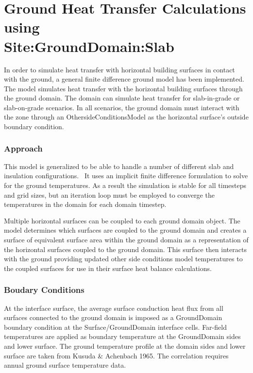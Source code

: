 \section{Ground Heat Transfer Calculations using \\ Site:GroundDomain:Slab}\label{ground-heat-transfer-calculations-using-sitegrounddomainslab}

In order to simulate heat transfer with horizontal building surfaces in contact with the ground, a general finite difference ground model has been implemented. The model simulates heat transfer with the horizontal building surfaces through the ground domain. The domain can simulate heat transfer for slab-in-grade or slab-on-grade scenarios. In all scenarios, the ground domain must interact with the zone through an OthersideConditionsModel as the horizontal surface's outside boundary condition.

\subsubsection{Approach}\label{approach-001}

This model is generalized to be able to handle a number of different slab and insulation configurations.~ It uses an implicit finite difference formulation to solve for the ground temperatures. As a result the simulation is stable for all timesteps and grid sizes, but an iteration loop must be employed to converge the temperatures in the domain for each domain timestep.

Multiple horizontal surfaces can be coupled to each ground domain object. The model determines which surfaces are coupled to the ground domain and creates a surface of equivalent surface area within the ground domain as a representation of the horizontal surfaces coupled to the ground domain. This surface then interacts with the ground providing updated other side conditions model temperatures to the coupled surfaces for use in their surface heat balance calculations.

\subsubsection{Boudary Conditions}\label{boudary-conditions}

At the interface surface, the average surface conduction heat flux from all surfaces connected to the ground domain is imposed as a GroundDomain boundary condition at the Surface/GroundDomain interface cells. Far-field temperatures are applied as boundary temperature at the GroundDomain sides and lower surface. The ground temperature profile at the domain sides and lower surface are taken from Kusuda \& Achenbach 1965. The correlation requires annual ground surface temperature data.

